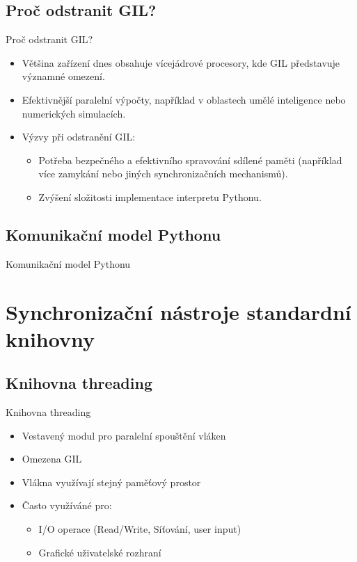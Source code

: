 \documentclass{beamer}
\begin{document}
\subsection{Proč odstranit GIL?}
\begin{frame}{Proč odstranit GIL?}
	\begin{itemize}
		\item Většina zařízení dnes obsahuje vícejádrové procesory, kde GIL představuje významné omezení.
		\item Efektivnější paralelní výpočty, například v oblastech umělé inteligence nebo numerických simulacích.
		\item Výzvy při odstranění GIL:
		\begin{itemize}
			\item [\textendash] Potřeba bezpečného a efektivního spravování sdílené paměti (například více zamykání nebo jiných synchronizačních mechanismů).
			\item [\textendash] Zvýšení složitosti implementace interpretu Pythonu.
		\end{itemize}
	\end{itemize}
\end{frame}

\subsection{Komunikační model Pythonu}
\begin{frame}{Komunikační model Pythonu}

\end{frame}

\section{Synchronizační nástroje standardní knihovny}
\subsection{Knihovna threading}

\begin{frame}{Knihovna threading}
    \begin{itemize}
        \item Vestavený modul pro paralelní spouštění vláken
        \item Omezena GIL
        \item Vlákna využívají stejný paměťový prostor
        \vskip 0.35in
        \item Často využíváné pro:
        \begin{itemize}
            \item I/O operace (Read/Write, Síťování, user input)
            \item Grafické uživatelské rozhraní 
        \end{itemize}
    \end{itemize}
\end{frame}
\end{document}
